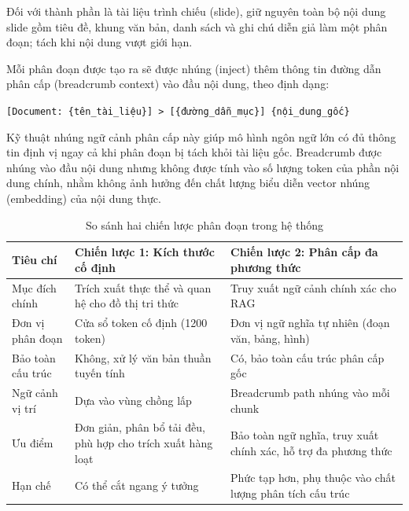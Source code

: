 Đối với thành phần là tài liệu trình chiếu (slide), giữ nguyên toàn bộ nội dung slide gồm tiêu đề, khung văn bản, danh sách và ghi chú diễn giả làm một phân đoạn; tách khi nội dung vượt giới hạn.


\indent Mỗi phân đoạn được tạo ra sẽ được nhúng (inject) thêm thông tin đường dẫn phân cấp (breadcrumb context) vào đầu nội dung, theo định dạng:

\begin{center}
	\texttt{[Document: \{tên\_tài\_liệu\}] > [\{đường\_dẫn\_mục\}] \{nội\_dung\_gốc\}}
\end{center}

\noindent Kỹ thuật nhúng ngữ cảnh phân cấp này giúp mô hình ngôn ngữ lớn có đủ thông tin định vị ngay cả khi phân đoạn bị tách khỏi tài liệu gốc. Breadcrumb được nhúng vào đầu nội dung nhưng không được tính vào số lượng token của phần nội dung chính, nhằm không ảnh hưởng đến chất lượng biểu diễn vector nhúng (embedding) của nội dung thực.

\begin{table}[H]
	\centering
	\caption{So sánh hai chiến lược phân đoạn trong hệ thống}
	\label{tab:so_sanh_chunking}

	\renewcommand{\arraystretch}{1.4}
	\begin{tabular}{|p{3.5cm}|p{5.5cm}|p{5.5cm}|}
		\hline
		Tiêu chí & Chiến lược 1: Kích thước cố định & Chiến lược 2: Phân cấp đa phương thức \\ \hline
		Mục đích chính & Trích xuất thực thể và quan hệ cho đồ thị tri thức & Truy xuất ngữ cảnh chính xác cho RAG \\ \hline
		Đơn vị phân đoạn & Cửa sổ token cố định (1200 token) & Đơn vị ngữ nghĩa tự nhiên (đoạn văn, bảng, hình) \\ \hline
		Bảo toàn cấu trúc & Không, xử lý văn bản thuần tuyến tính & Có, bảo toàn cấu trúc phân cấp gốc \\ \hline
		Ngữ cảnh vị trí & Dựa vào vùng chồng lấp & Breadcrumb path nhúng vào mỗi chunk \\ \hline
		Ưu điểm & Đơn giản, phân bổ tải đều, phù hợp cho trích xuất hàng loạt & Bảo toàn ngữ nghĩa, truy xuất chính xác, hỗ trợ đa phương thức \\ \hline
		Hạn chế & Có thể cắt ngang ý tưởng & Phức tạp hơn, phụ thuộc vào chất lượng phân tích cấu trúc \\ \hline
	\end{tabular}
\end{table}

